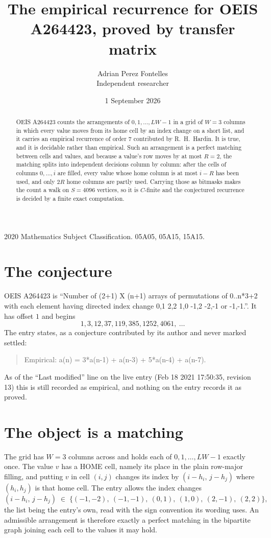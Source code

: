 \documentclass[11pt,a4paper]{article}
\title{The empirical recurrence for OEIS A264423, proved by transfer matrix}
\author{Adrian Perez Fontelles\\ \small Independent researcher}
\date{1 September 2026}
\theoremstyle{plain}
\theoremstyle{definition}
\begin{document}
\maketitle

\begin{abstract}
OEIS A264423 counts the arrangements of $0,1,\dots,LW-1$ in a grid of $W=3$ columns in which
every value moves from its home cell by an index change on a short list, and it carries an
empirical recurrence of order $7$ contributed by R.~H.~Hardin. It is true, and it is
decidable rather than empirical. Such an arrangement is a perfect matching between cells and
values, and because a value's row moves by at most $R=2$, the matching splits into
independent decisions column by column: after the cells of columns $0,\dots,i$ are filled,
every value whose home column is at most $i-R$ has been used, and only $2R$ home columns are
partly used. Carrying those as bitmasks makes the count a walk on $S=4096$ vertices, so it is
$C$-finite and the conjectured recurrence is decided by a finite exact computation.
\end{abstract}

\noindent\small 2020 Mathematics Subject Classification. 05A05, 05A15, 15A15.\normalsize

\section{The conjecture}

OEIS A264423 is ``Number of (2+1) X (n+1) arrays of permutations of 0..n*3+2 with each element having directed index change 0,1 2,2 1,0 -1,2 -2,-1 or -1,-1.''. It has offset $1$ and begins
\[
1, 3, 12, 37, 119, 385, 1252, 4061,\ \dots
\]
The entry states, as a conjecture contributed by its author and never marked settled:
\begin{quote}
Empirical: a(n) = 3*a(n-1) + a(n-3) + 5*a(n-4) + a(n-7).
\end{quote}
As of the ``Last modified'' line on the live entry (Feb 18 2021 17:50:35, revision 13) this is still
recorded as empirical, and nothing on the entry records it as proved.

\section{The object is a matching}

The grid has $W=3$ columns across and holds each of $0,1,\dots,LW-1$ exactly once. The value
$v$ has a HOME cell, namely its place in the plain row-major filling, and putting $v$ in cell
$(i,j)$ changes its index by $(i-h_i,\,j-h_j)$ where $(h_i,h_j)$ is that home cell. The entry
allows the index changes
\[
(i-h_i,\,j-h_j)\;\in\;\{(-1,-2),\ (-1,-1),\ (0,1),\ (1,0),\ (2,-1),\ (2,2)\},
\]
the list being the entry's own, read with the sign convention its wording uses. An admissible
arrangement is therefore exactly a perfect matching in the bipartite graph joining each cell to
the values it may hold.
\end{document}
